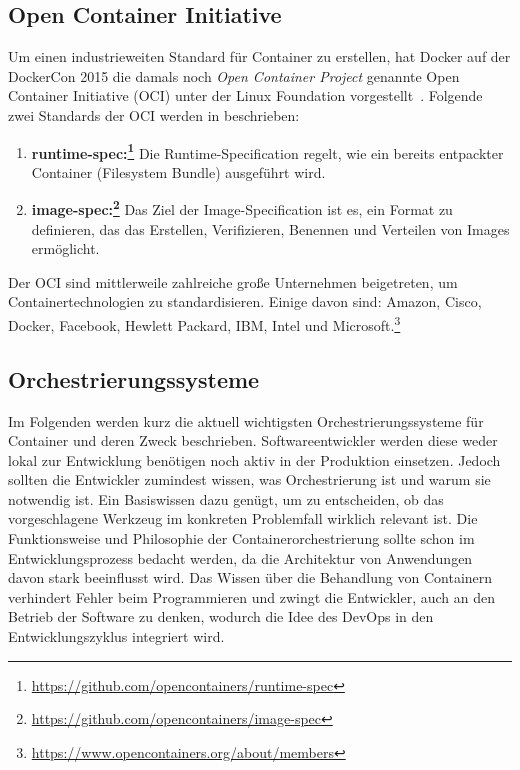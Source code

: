 \subsection{Open Container Initiative}
\label{sec:open-container-initiative}
Um einen industrieweiten Standard für Container zu erstellen, hat Docker auf der DockerCon 2015 die damals noch \emph{Open Container Project} genannte Open Container Initiative (OCI) unter der Linux Foundation vorgestellt~\autocite{docker-ocp:online}.
Folgende zwei Standards der OCI werden in \autocite{oci-about:online} beschrieben:
\begin{enumerate}
    \item \textbf{runtime-spec:\footnote{\url{https://github.com/opencontainers/runtime-spec}}} Die Runtime-Specification regelt, wie ein bereits entpackter Container (Filesystem Bundle) ausgeführt wird.
    \item \textbf{image-spec:\footnote{\url{https://github.com/opencontainers/image-spec}}} Das Ziel der Image-Specification ist es, ein Format zu definieren, das das Erstellen, Verifizieren, Benennen und Verteilen von Images ermöglicht.
\end{enumerate}
Der OCI sind mittlerweile zahlreiche große Unternehmen beigetreten, um Containertechnologien zu standardisieren. Einige davon sind: Amazon, Cisco, Docker, Facebook, Hewlett Packard, IBM, Intel und Microsoft.\footnote{\url{https://www.opencontainers.org/about/members}}

\subsection{Orchestrierungssysteme}
\label{sec:orchestrierungssysteme}
Im Folgenden werden kurz die aktuell wichtigsten Orchestrierungssysteme für Container \autocite{ix-orchestrierung-2017} und deren Zweck beschrieben.
Softwareentwickler werden diese weder lokal zur Entwicklung benötigen noch aktiv in der Produktion einsetzen.
Jedoch sollten die Entwickler zumindest wissen, was Orchestrierung ist und warum sie notwendig ist.
Ein Basiswissen dazu genügt, um zu entscheiden, ob das vorgeschlagene Werkzeug im konkreten Problemfall wirklich relevant ist.
Die Funktionsweise und Philosophie der Containerorchestrierung sollte schon im Entwicklungsprozess bedacht werden, da die Architektur von Anwendungen davon stark beeinflusst wird.
Das Wissen über die Behandlung von Containern verhindert Fehler beim Programmieren und zwingt die Entwickler, auch an den Betrieb der Software zu denken, wodurch die Idee des DevOps in den Entwicklungszyklus integriert wird.

